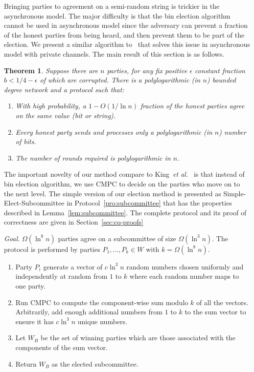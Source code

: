 \documentclass[11pt,letter]{article}
\newcommand{\etal}{\emph{et al.}}
\theoremstyle{mytheoremstyle}
\newtheorem{theorem}{Theorem}
\let\savedCaption=\caption
\renewcommand*{\caption}[1]{\savedCaption[#1]{~#1}}
\newcommand{\algfont}{}
\newcommand{\hw}{\mbox{\textsf{CMPC}}\xspace}
\newcommand{\binelection}{{bin election}\xspace}
\newcommand{\simplees}{\mbox{\textsf{Simple-Elect-Subcommittee}}\xspace}
\begin{document}
Bringing parties to agreement on a semi-random string is trickier in the asynchronous model. The major difficulty is that the \binelection algorithm cannot be used in asynchronous model since the adversary can prevent a fraction of the honest parties from being heard, and then prevent them to be part of the election. We present a similar algorithm to~\cite{King:2006:TSS:1170136.1170491} that solves this issue in asynchronous model with private channels. The main result of this section is as follows.

\begin{theorem}\label{t:mainbyz}
	Suppose there are $n$ parties, for any fix positive $\epsilon$ constant fraction $b < 1/4 - \epsilon $ of which are corrupted. There is a polylogarithmic (in $n$) bounded degree network and a protocol such that:
	\begin{enumerate}
		\item With high probability,  a $1 - O(1/\ln{n})$ fraction of the honest parties agree on the same value (bit or string).
		\item Every honest party sends and processes only a polylogarithmic (in $n$) number of bits.
		\item The number of rounds required is polylogarithmic in $n$.
	\end{enumerate}
\end{theorem}

The important novelty of our method compare to King~\etal~\cite{King:2006:TSS:1170136.1170491} is that instead of \binelection algorithm, we use \hw to decide on the parties who move on to the next level. The simple version of our election method is presented as \simplees in Protocol~\ref{pro:subcommittee} that has the properties described in Lemma~\ref{lem:subcommittee}. The complete protocol and its proof of correctness are given in Section~\ref{sec:cq-proofs}

\begin{algorithm}
	\caption{\simplees}
	\label{pro:subcommittee}
	\medskip
	\algfont
	\textit{Goal.} $\Omega(\ln^8{n})$ parties agree on a subcommittee of size $\Omega(\ln^3{n})$. The protocol is performed by parties $P_1,...,P_k \in W$ with $k = \Omega(\ln^8{n})$.
	
	\begin{enumerate}
		\item Party $P_i$ generate a vector of $c \ln^3{n}$ random numbers chosen uniformly and independently at random from $1$ to $k$ where each random number maps to one party.
		\item Run \hw to compute the component-wise sum modulo $k$ of all the vectors. Arbitrarily, add enough additional numbers from $1$ to $k$ to the sum vector to ensure it has  $c \ln^3{n}$  unique numbers.
		\item Let $W_B$ be the set of winning parties which are those associated with the components of the sum vector.
		\item Return $W_B$ as the elected subcommittee.
	\end{enumerate}
\end{algorithm}
\end{document}
